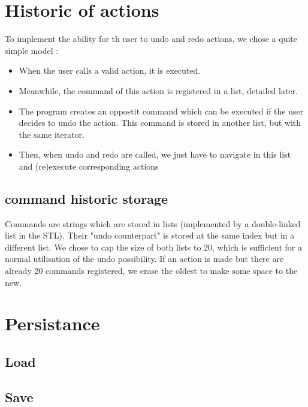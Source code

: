 \documentclass[a4paper, 12pts]{article}
\begin{document}
\section{Historic of actions}
    To implement the ability for th user to undo and redo actions, we chose a quite simple model :
    \begin{itemize}
        \item When the user calls a valid action, it is executed.
        \item Meanwhile, the command of this action is registered in a list, detailed later.
        \item The program creates an oppostit command which can be executed if the user decides to undo the action.
        This command is stored in another list, but with the same iterator.
        \item Then, when undo and redo are called, we just have to navigate in this list and (re)execute corresponding
        actions
    \end{itemize}

    \subsection{command historic storage}
        Commands are strings which are stored in lists (implemented by a double-linked list in the STL). Their "undo
        counterpart" is stored at the same index but in a different list. We chose to cap the size of both lists to 20,
        which is sufficient for a normal utilisation of the undo possibility. If an action is made but there are
        already 20 commands registered, we erase the oldest to make some space to the new.

\section{Persistance}
    \subsection{Load}
    \subsection{Save}
\end{document}
